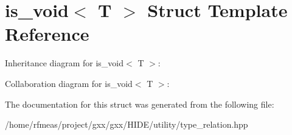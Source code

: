 \hypertarget{structis__void}{}\section{is\+\_\+void$<$ T $>$ Struct Template Reference}
\label{structis__void}


Inheritance diagram for is\+\_\+void$<$ T $>$\+:


Collaboration diagram for is\+\_\+void$<$ T $>$\+:


The documentation for this struct was generated from the following file\+:\begin{DoxyCompactItemize}
\item 
/home/rfmeas/project/gxx/gxx/\+H\+I\+D\+E/utility/type\+\_\+relation.\+hpp\end{DoxyCompactItemize}
